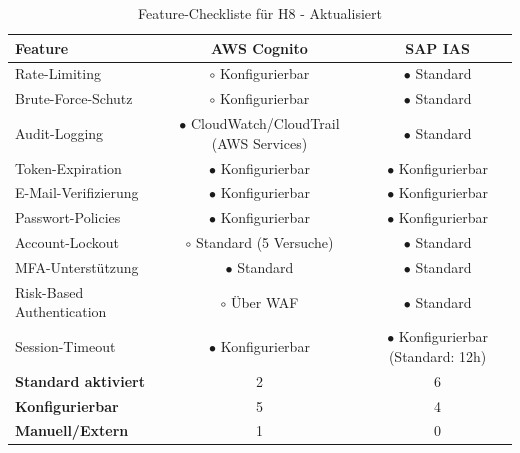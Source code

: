 \begin{table}[h]
    \centering
    \small
    \begin{tabular}{|l|c|c|}
        \hline
        \textbf{Feature} & \textbf{AWS Cognito}                           & \textbf{SAP IAS}                         \\
        \hline
        Rate-Limiting  & $\circ$ Konfigurierbar                           & $\bullet$ Standard                       \\
        \hline
        Brute-Force-Schutz & $\circ$ Konfigurierbar                           & $\bullet$ Standard                       \\
        \hline
        Audit-Logging  & $\bullet$ CloudWatch/CloudTrail (AWS Services)          & $\bullet$ Standard \\
        \hline
        Token-Expiration & $\bullet$ Konfigurierbar                           & $\bullet$ Konfigurierbar                 \\
        \hline
        E-Mail-Verifizierung & $\bullet$ Konfigurierbar                           & $\bullet$ Konfigurierbar                 \\
        \hline
        Passwort-Policies  & $\bullet$ Konfigurierbar                           & $\bullet$ Konfigurierbar                 \\
        \hline
        Account-Lockout  & $\circ$ Standard (5 Versuche)                            & $\bullet$ Standard                       \\
        \hline
        MFA-Unterstützung  & $\bullet$ Standard                           & $\bullet$ Standard                       \\
        \hline
        Risk-Based Authentication  & $\circ$ Über WAF                           & $\bullet$ Standard                       \\
        \hline
        Session-Timeout  & $\bullet$ Konfigurierbar                           & $\bullet$ Konfigurierbar (Standard: 12h) \\
        \hline
        \hline
        \textbf{Standard aktiviert}  & 2                            & 6                                        \\
        \hline
        \textbf{Konfigurierbar}  & 5                            & 4                                        \\
        \hline
        \textbf{Manuell/Extern}  & 1                            & 0                                        \\
        \hline
    \end{tabular}
    \caption{Feature-Checkliste für H8 - Aktualisiert}
    \label{tab:h8_features}
\end{table}

